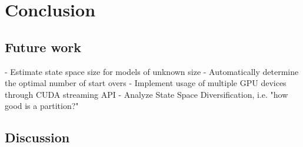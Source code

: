 \documentclass[
fancyheadings, %
%
%
]{stsreprt}
\begin{document}
\chapter{Conclusion}

\section{Future work}

- Estimate state space size for models of unknown size
- Automatically determine the optimal number of start overs
- Implement usage of multiple GPU devices through CUDA streaming API
- Analyze State Space Diversification, i.e. "how good is a partition?"

\section{Discussion}



\backmatter

\printbibliography[heading=bibintoc]
\end{document}
